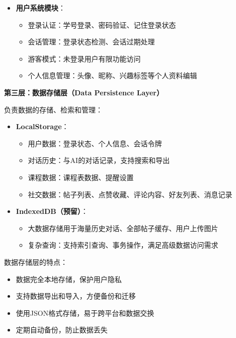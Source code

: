 \documentclass[12pt,a4paper]{article}
\begin{document}
\begin{itemize}
    \item \textbf{用户系统模块}：
        \begin{itemize}
            \item 登录认证：学号登录、密码验证、记住登录状态
            \item 会话管理：登录状态检测、会话过期处理
            \item 游客模式：未登录用户有限功能访问
            \item 个人信息管理：头像、昵称、兴趣标签等个人资料编辑
        \end{itemize}
\end{itemize}

\vspace{0.3cm}
\noindent\textbf{第三层：数据存储层（Data Persistence Layer）}

负责数据的存储、检索和管理：

\begin{itemize}
    \item \textbf{LocalStorage}：
        \begin{itemize}
            \item 用户数据：登录状态、个人信息、会话令牌
            \item 对话历史：与AI的对话记录，支持搜索和导出
            \item 课程数据：课程表数据、提醒设置
            \item 社交数据：帖子列表、点赞收藏、评论内容、好友列表、消息记录
        \end{itemize}
    
    \item \textbf{IndexedDB（预留）}：
        \begin{itemize}
            \item 大数据存储用于海量历史对话、全部帖子缓存、用户上传图片
            \item 复杂查询：支持索引查询、事务操作，满足高级数据访问需求
        \end{itemize}
\end{itemize}

数据存储层的特点：
\begin{itemize}
    \item 数据完全本地存储，保护用户隐私
    \item 支持数据导出和导入，方便备份和迁移
    \item 使用JSON格式存储，易于跨平台和数据交换
    \item 定期自动备份，防止数据丢失
\end{itemize}
\end{document}

